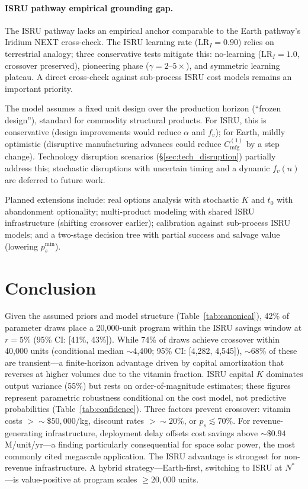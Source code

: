 \documentclass[preprint,12pt]{elsarticle}
\begin{document}
\paragraph{ISRU pathway empirical grounding gap.} The ISRU pathway lacks an empirical anchor comparable to the Earth pathway's Iridium NEXT cross-check. The ISRU learning rate ($\mathrm{LR}_I = 0.90$) relies on terrestrial analogy; three conservative tests mitigate this: no-learning ($\mathrm{LR}_I = 1.0$, crossover preserved), pioneering phase ($\gamma = 2$--$5\times$), and symmetric learning plateau. A direct cross-check against sub-process ISRU cost models remains an important priority.

The model assumes a fixed unit design over the production horizon (``frozen design''), standard for commodity structural products. For ISRU, this is conservative (design improvements would reduce $\alpha$ and $f_v$); for Earth, mildly optimistic (disruptive manufacturing advances could reduce $C_{\mathrm{mfg}}^{(1)}$ by a step change). Technology disruption scenarios (\S\ref{sec:tech_disruption}) partially address this; stochastic disruptions with uncertain timing and a dynamic $f_v(n)$ are deferred to future work.

Planned extensions include: real options analysis with stochastic $K$ and $t_0$ with abandonment optionality; multi-product modeling with shared ISRU infrastructure (shifting crossover earlier); calibration against sub-process ISRU models; and a two-stage decision tree with partial success and salvage value (lowering $p_s^{\min}$).

\section{Conclusion}
\label{sec:conclusion}

Given the assumed priors and model structure (Table~\ref{tab:canonical}), 42\% of parameter draws place a 20{,}000-unit program within the ISRU savings window at $r = 5\%$ (95\% CI: [41\%, 43\%]). While 74\% of draws achieve crossover within 40{,}000 units (conditional median $\sim$4{,}400; 95\% CI: [4{,}282, 4{,}545]), ${\sim}$68\% of these are transient---a finite-horizon advantage driven by capital amortization that reverses at higher volumes due to the vitamin fraction. ISRU capital $K$ dominates output variance (55\%) but rests on order-of-magnitude estimates; these figures represent parametric robustness conditional on the cost model, not predictive probabilities (Table~\ref{tab:confidence}). Three factors prevent crossover: vitamin costs $> {\sim}\$50{,}000$/kg, discount rates $> {\sim}20\%$, or $p_s \lesssim 70\%$. For revenue-generating infrastructure, deployment delay offsets cost savings above ${\sim}\$0.94$M/unit/yr---a finding particularly consequential for space solar power, the most commonly cited megascale application. The ISRU advantage is strongest for non-revenue infrastructure. A hybrid strategy---Earth-first, switching to ISRU at $N^*$---is value-positive at program scales $\geq 20{,}000$ units.
\end{document}
